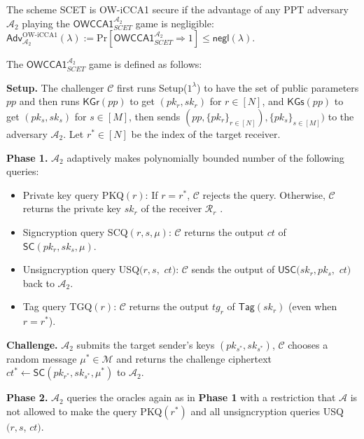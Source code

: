 \documentclass[a4paper,11pt,onecolumn]{elsarticle}
\def\Pr{\mathrm{Pr}}
\begin{document}
					\fi
			
			\begin{definition}[OW-iCCA1] \label{owcca2}
				The scheme SCET is OW-iCCA1 secure if the advantage of  any PPT adversary  $\mathcal{A}_2$ playing the $\mathsf{OWCCA1}^{\mathcal{A}_2}_{SCET}$  game is negligible: $\mathsf{Adv}^{\text{OW-iCCA1}}_{\mathcal{A}_2}(\lambda):= \Pr[\mathsf{OWCCA1}^{\mathcal{A}_   2}_{SCET}\Rightarrow 1] \leq \mathsf{negl}(\lambda).$
			\end{definition}
			
			
			
			The $\mathsf{OWCCA1}^{\mathcal{A}_2}_{SCET}$ game is defined as follows:
	
				\textbf{Setup.} The challenger  $\mathcal{C}$ first runs \textsf{Setup($1^{\lambda}$)} to have the set of  public parameters $pp$ and then runs $\textsf{KGr}(pp)$ to get $(pk_{r}, sk_{r})$ for $r\in[N]$, and $\textsf{KGs}(pp)$ to get $(pk_{s}, sk_{s})$ for $s\in[M]$, then sends $(pp, \{pk_{r}\}_{r \in [N]}), \{pk_{s}\}_{s \in [M]})$  to the adversary $\mathcal{A}_2$. Let $r^*\in[N]$ be the index of the target receiver.
				
			 \textbf{Phase 1.}  $\mathcal{A}_2$ adaptively makes polynomially bounded number of the following queries:
				\begin{itemize}
					\item Private key query  PKQ$(r)$: If $r=r^*$,  $\mathcal{C}$ rejects the query. Otherwise, $\mathcal{C}$ returns the private key $sk_{r}$ of the receiver $\mathcal{R}_{r}$ . 
					\item Signcryption query SCQ$(r,s,\mu)$: $\mathcal{C}$ returns the output $ct$ of $\textsf{SC}(pk_{r},sk_{s},\mu)$.
					\item Unsigncryption query  USQ$(r,s,$ $ct)$:  $\mathcal{C}$ sends the output  of $\textsf{USC}(sk_{r},pk_{s},$ $ct)$ back to $\mathcal{A}_2$.
					\item Tag query TGQ$(r)$: $\mathcal{C}$ returns the output $tg_{r}$ of $\textsf{Tag}(sk_{r})$ (even when $r=r^*$).
				\end{itemize}
				
			 \textbf{Challenge.}  $\mathcal{A}_2$ submits  the target sender's keys $(pk_{s^*}, sk_{s^*})$, $\mathcal{C}$ chooses a random message $\mu^* \in \mathcal{M}$ and returns the challenge ciphertext $ct^*\leftarrow \textsf{SC}(pk_{r^*}, sk_{s^*},\mu^*)$ to $\mathcal{A}_2$.
			 
			\textbf{Phase 2.}  $\mathcal{A}_2$ queries the oracles again as in \textbf{Phase 1} with a restriction that $\mathcal{A}$ is not allowed to make the query PKQ$(r^*)$ and all unsigncryption queries USQ$(r,s$, $ct)$.
			
\end{document}
